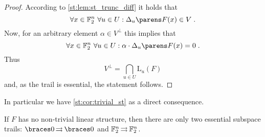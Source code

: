 \begin{proof}
    According to \cref{st:lem:st_trunc_diff} it holds that
    \begin{equation*}
        \forall x \in \F_2^n \ \forall u \in U: \derive{u}{F}(x) \in V\;.
    \end{equation*}
    Now, for an arbitrary element $\alpha \in V^{\perp}$ this implies that
    \begin{equation*}
        \forall x \in \F_2^n \ \forall u \in U: \iprod{\alpha}{\derive{u}{F}(x)} = 0\;.
    \end{equation*}
    Thus
    \begin{equation*}
        V^\perp = \bigcap_{u \in U} \mathrm{L}_{u}(F)
    \end{equation*}
    and, as the trail is essential, the statement follows.
\end{proof}

In particular we have \cref{st:cor:trivial_st} as a direct consequence.
\begin{corollary}\label{st:cor:trivial_st}
    If $F$ has no non-trivial linear structure, then there are only two essential subspace trails: $\propDiff{\set{0}}{}{}{\set{0}}$ and $\mathbb{F}_2^n \operatorname*{\rightrightarrows}^{}_{} \mathbb{F}_2^n$.
\end{corollary}

